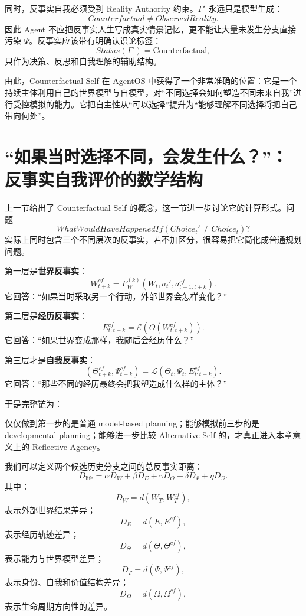 同时，反事实自我必须受到 Reality Authority 约束。$\Gamma'$ 永远只是模型生成：
\[
Counterfactual
\neq
ObservedReality.
\]
因此 Agent 不应把反事实人生写成真实情景记忆，更不能让大量未发生分支直接污染 $\Psi$。反事实应该带有明确认识论标签：
\[
Status(\Gamma')=\mathrm{Counterfactual},
\]
只作为决策、反思和自我理解的辅助结构。

由此，Counterfactual Self 在 AgentOS 中获得了一个非常准确的位置：它是一个持续主体利用自己的世界模型与自模型，对“不同选择会如何塑造不同未来自我”进行受控模拟的能力。它把自主性从“可以选择”提升为“能够理解不同选择将把自己带向何处”。

\section{``如果当时选择不同，会发生什么？''：反事实自我评价的数学结构}

上一节给出了 Counterfactual Self 的概念，这一节进一步讨论它的计算形式。问题
\[
\boxed{
WhatWouldHaveHappenedIf
\left(
Choice_t'\neq Choice_t
\right)?
}
\]
实际上同时包含三个不同层次的反事实，若不加区分，很容易把它简化成普通规划问题。

第一层是\textbf{世界反事实}：
\[
W_{t+k}^{cf}
=
F_W^{(k)}
\left(
W_t,
a_t',
a_{t+1:t+k}^{cf}
\right).
\]
它回答：“如果当时采取另一个行动，外部世界会怎样变化？”

第二层是\textbf{经历反事实}：
\[
E_{t:t+k}^{cf}
=
\mathcal E
\left(
O(W_{t:t+k}^{cf})
\right).
\]
它回答：“如果世界变成那样，我随后会经历什么？”

第三层才是\textbf{自我反事实}：
\[
(\Theta_{t+k}^{cf},\Psi_{t+k}^{cf})
=
\mathcal L
\left(
\Theta_t,\Psi_t,E_{t:t+k}^{cf}
\right).
\]
它回答：“那些不同的经历最终会把我塑造成什么样的主体？”

于是完整链为：
\begin{statementbox}
\centering
{}
\end{statementbox}
仅仅做到第一步的是普通 model-based planning；能够模拟前三步的是 developmental planning；能够进一步比较 Alternative Self 的，才真正进入本章意义上的 Reflective Agency。

我们可以定义两个候选历史分支之间的总反事实距离：
\[
D_{\mathrm{life}}
=
\alpha D_W
+
\beta D_E
+
\gamma D_\Theta
+
\delta D_\Psi
+
\eta D_\Omega.
\]
其中：
\[
D_W=d(W_T,W_T^{cf}),
\]
表示外部世界结果差异；
\[
D_E=d(E,E^{cf}),
\]
表示经历轨迹差异；
\[
D_\Theta=d(\Theta,\Theta^{cf}),
\]
表示能力与世界模型差异；
\[
D_\Psi=d(\Psi,\Psi^{cf}),
\]
表示身份、自我和价值结构差异；
\[
D_\Omega=d(\Omega,\Omega^{cf}),
\]
表示生命周期方向性的差异。

